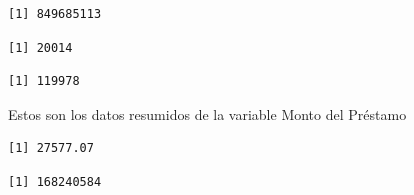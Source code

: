 \documentclass[
  letterpaper,
  DIV=11,
  numbers=noendperiod]{scrreprt}
\newenvironment{Shaded}{\begin{snugshade}}{\end{snugshade}}
\newcommand{\NormalTok}[1]{\textcolor[rgb]{0.00,0.23,0.31}{#1}}
\newcommand{\SpecialCharTok}[1]{\textcolor[rgb]{0.37,0.37,0.37}{#1}}
\begin{document}
\begin{verbatim}
[1] 849685113
\end{verbatim}

\begin{Shaded}
\end{Shaded}

\begin{verbatim}
[1] 20014
\end{verbatim}

\begin{Shaded}
\end{Shaded}

\begin{verbatim}
[1] 119978
\end{verbatim}

Estos son los datos resumidos de la variable Monto del Préstamo

\begin{Shaded}
\end{Shaded}

\begin{verbatim}
[1] 27577.07
\end{verbatim}

\begin{Shaded}
\end{Shaded}

\begin{verbatim}
[1] 168240584
\end{verbatim}

\begin{Shaded}
\end{Shaded}
\end{document}
